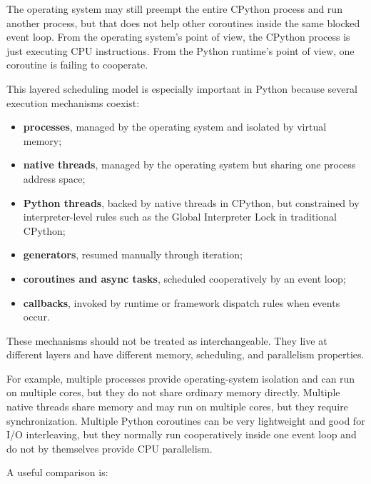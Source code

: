 The operating system may still preempt the entire CPython process and run another process, but that does not help other coroutines inside the same blocked event loop. From the operating system's point of view, the CPython process is just executing CPU instructions. From the Python runtime's point of view, one coroutine is failing to cooperate.

This layered scheduling model is especially important in Python because several execution mechanisms coexist:

\begin{itemize}
    \item \textbf{processes}, managed by the operating system and isolated by virtual memory;
    \item \textbf{native threads}, managed by the operating system but sharing one process address space;
    \item \textbf{Python threads}, backed by native threads in CPython, but constrained by interpreter-level rules such as the Global Interpreter Lock in traditional CPython;
    \item \textbf{generators}, resumed manually through iteration;
    \item \textbf{coroutines and async tasks}, scheduled cooperatively by an event loop;
    \item \textbf{callbacks}, invoked by runtime or framework dispatch rules when events occur.
\end{itemize}

These mechanisms should not be treated as interchangeable. They live at different layers and have different memory, scheduling, and parallelism properties.

For example, multiple processes provide operating-system isolation and can run on multiple cores, but they do not share ordinary memory directly. Multiple native threads share memory and may run on multiple cores, but they require synchronization. Multiple Python coroutines can be very lightweight and good for I/O interleaving, but they normally run cooperatively inside one event loop and do not by themselves provide CPU parallelism.

A useful comparison is:

